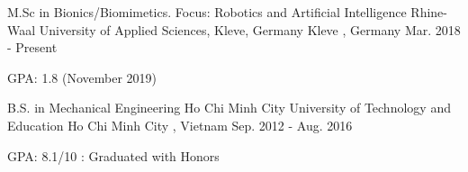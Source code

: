 

\begin{cventries}
  \cventry
    {M.Sc in Bionics/Biomimetics. Focus: Robotics and Artificial Intelligence} %
    {Rhine-Waal University of Applied Sciences, Kleve, Germany} %
    {Kleve , Germany} %
    {Mar. 2018 - Present} %
    {
      \begin{cvitems} %
        \item {GPA: 1.8 (November 2019)}
      \end{cvitems}
    }
  \cventry
    {B.S. in Mechanical Engineering} %
    {Ho Chi Minh City University of Technology and Education} %
    {Ho Chi Minh City , Vietnam} %
    {Sep. 2012 - Aug. 2016} %
    {
      \begin{cvitems} %
        \item {GPA: 8.1/10 : Graduated with Honors}
      \end{cvitems}
    }

\end{cventries}

